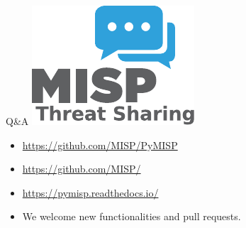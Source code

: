 \begin{frame}[t,fragile] {Q\&A}
\includegraphics[scale=0.5]{misplogo.pdf}
\begin{itemize}
        \item \url{https://github.com/MISP/PyMISP}
        \item \url{https://github.com/MISP/}
        \item \url{https://pymisp.readthedocs.io/}
        \item We welcome new functionalities and pull requests.
\end{itemize}

\end{frame}


